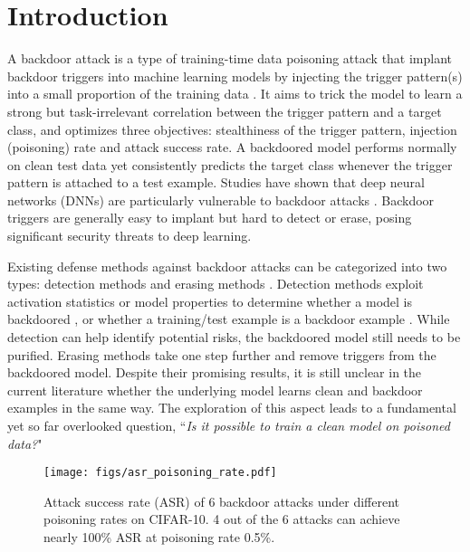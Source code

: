 \section{Introduction} \label{sec:1}
A backdoor attack is a type of training-time data poisoning attack that implant backdoor triggers into machine learning models by injecting the trigger pattern(s) into a small proportion of the training data \cite{gu2017badnets}. It aims to trick the model to learn a strong but task-irrelevant correlation between the trigger pattern and a target class, and optimizes three objectives: stealthiness of the trigger pattern, injection (poisoning) rate and attack success rate. A backdoored model performs normally on clean test data yet consistently predicts the target class whenever the trigger pattern is attached to a test example. Studies have shown that deep neural networks (DNNs) are particularly vulnerable to backdoor attacks \cite{weng2020trade}. Backdoor triggers are generally easy to implant but hard to detect or erase, posing significant security threats to deep learning.  

Existing defense methods against backdoor attacks can be categorized into two types: detection methods and erasing methods \cite{li2020backdoor}.  Detection methods exploit activation statistics or model properties to determine whether a model is backdoored \cite{wang2019neural,chen2019deepinspect}, or whether a training/test example is a backdoor example \cite{tran2018spectral, chen2018detecting}. While detection can help identify potential risks, the backdoored model still needs to be purified. Erasing methods \cite{liu2018fine,zhao2020bridging,li2021neural} take one step further and remove triggers from the backdoored model. Despite their promising results, it is still unclear in the current literature whether the underlying model learns clean and backdoor examples in the same way.
The exploration of this aspect leads to a fundamental yet so far overlooked question, “\textit{Is it possible to train a clean model on poisoned data?}"

\begin{wrapfigure}{r}{0.38\textwidth}
  \begin{center}
    \vspace{-0.2in}
    \texttt{[image: figs/asr\_poisoning\_rate.pdf]}
  \end{center}
  	\vspace{-0.2in}
  \caption{Attack success rate (ASR) of 6 backdoor attacks under different poisoning rates on CIFAR-10. 4 out of the 6 attacks can achieve nearly 100\% ASR at poisoning rate 0.5\%.
  }
  \label{img1}
\end{wrapfigure}

